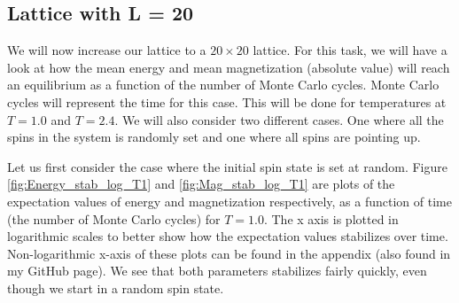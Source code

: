 \documentclass[12pt]{article}
\begin{document}
\subsection*{Lattice with L = 20}
We will now increase our lattice to a $20\times 20$ lattice.  For this task, we will have a look at how the mean energy and mean magnetization (absolute value) will reach an equilibrium as a function of the number of Monte Carlo cycles. Monte Carlo cycles will represent the time for this case. This will be done for temperatures at $T=1.0$ and $T = 2.4$. We will also consider two different cases. One where all the spins in the system is randomly set and one where all spins are pointing up.
 
Let us first consider the case where the initial spin state is set at random. Figure \ref{fig:Energy_stab_log_T1} and \ref{fig:Mag_stab_log_T1} are plots of the expectation values of energy and magnetization respectively, as a function of time (the number of Monte Carlo cycles) for $T = 1.0$. The x axis is plotted in logarithmic scales to better show how the  expectation values stabilizes over time. Non-logarithmic x-axis of these plots can be found in the appendix (also found in my GitHub page). We see that both parameters stabilizes fairly quickly, even though we start in a random spin state.
\end{document}
